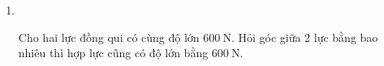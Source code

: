 \begin{enumerate}[label=\bfseries Câu \arabic*:]
{	}

\item {}\\
{Cho hai lực đồng qui có cùng độ lớn $\SI{600}{\newton}$. Hỏi góc giữa 2 lực bằng bao nhiêu thì hợp lực cũng có độ lớn bằng $\SI{600}{\newton}$.
}
	
\end{enumerate}
